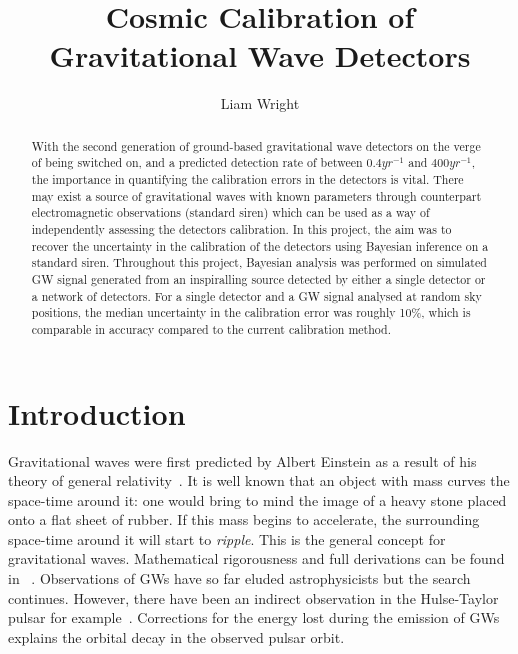 \documentclass{jpconf}
\begin{document}
\title{Cosmic Calibration of Gravitational Wave Detectors}




\author{Liam Wright}

\address{University of Glasgow, Glasgow, G12 8QQ, United Kingdom}
 
\begin{abstract}
  With the second generation of ground-based gravitational wave detectors on the verge of being switched on, and a predicted detection rate of between $0.4 yr^{-1}$ and $400 yr^{-1}$, the importance in quantifying the calibration errors in the detectors is vital. There may exist a source of gravitational waves with known parameters through counterpart electromagnetic observations (standard siren) which can be used as a way of independently assessing the detectors calibration. In this project, the aim was to recover the uncertainty in the calibration of the detectors using Bayesian inference on a standard siren. Throughout this project, Bayesian analysis was performed on simulated GW signal generated from an inspiralling source detected by either a single detector or a network of detectors. For a single detector and a GW signal analysed at random sky positions, the median uncertainty in the calibration error was roughly 10\%, which is comparable in accuracy compared to the current calibration method. %

\end{abstract}


\section{Introduction}
\label{sec:intro}



Gravitational waves were first predicted by Albert Einstein as a result of his theory of general relativity~\cite{einstein}. It is well known that an object with mass curves the space-time around it: one would bring to mind the image of a heavy stone placed onto a flat sheet of rubber. If this mass begins to accelerate, the surrounding space-time around it will start to \textit{ripple}. This is the general concept for gravitational waves. Mathematical rigorousness and full derivations can be found in ~\cite{genrel}. Observations of GWs have so far eluded astrophysicists but the search continues. However, there have been an indirect observation in the Hulse-Taylor pulsar for example~\cite{Hulse,hulseweis}. Corrections for the energy lost during the emission of GWs explains the orbital decay in the observed pulsar orbit.
\end{document}

